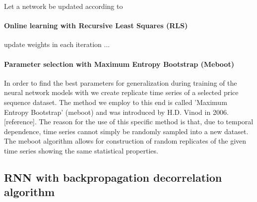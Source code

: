 \begin{frm-thm}
Let a network be updated according to
\end{frm-thm}

\paragraph*{Online learning with Recursive Least Squares (RLS)}
update weights in each iteration
...

\paragraph*{Parameter selection with Maximum Entropy Bootstrap (Meboot)}
In order to find the best parameters for generalization during training of the neural network models with we create replicate time series of a selected price sequence dataset. The method we employ to this end is called 'Maximum Entropy Bootstrap' (meboot) and was introduced by H.D. Vinod in 2006. [reference]. The reason for the use of this specific method is that, due to temporal dependence, time series cannot simply be randomly sampled into a new dataset. The meboot algorithm allows for construction of random replicates of the given time series showing the same statistical properties.

\subsection*{RNN with backpropagation decorrelation algorithm}

